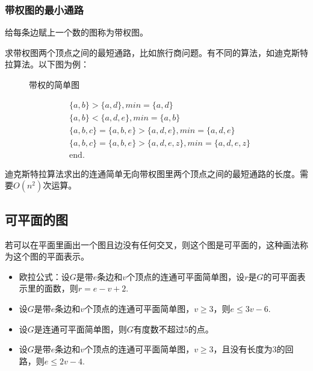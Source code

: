 \subsubsection*{带权图的最小通路}
给每条边赋上一个数的图称为带权图。

求带权图两个顶点之间的最短通路，比如旅行商问题。有不同的算法，如迪克斯特拉算法。以下图为例：

\begin{figure*}[htbp]
    \centering
    \caption{带权的简单图}
\end{figure*}

\begin{align*}
    & \{a, b\} > \{a, d\}, min = \{a ,d\} \\
    & \{a, b\} < \{a, d, e\}, min = \{a,b\} \\
    & \{a, b, c\} = \{a, b, e\} > \{a, d, e\}, min = \{a, d, e\}\\
    & \{a, b, c\} = \{a, b, e\} > \{a, d, e, z\}, min = \{a, d, e, z\}\\
    & \text{end.}
\end{align*}

迪克斯特拉算法求出的连通简单无向带权图里两个顶点之间的最短通路的长度。需要$O(n^2)$次运算。

\subsection{可平面的图}
若可以在平面里画出一个图且边没有任何交叉，则这个图是可平面的，这种画法称为这个图的平面表示。

\begin{itemize}
    \item 欧拉公式：设$G$是带$e$条边和$v$个顶点的连通可平面简单图，设$r$是$G$的可平面表示里的面数，则$r = e - v + 2$.
    \item 设$G$是带$e$条边和$v$个顶点的连通可平面简单图，$v \ge 3$，则$e \le 3v-6$.
    \item 设$G$是连通可平面简单图，则$G$有度数不超过5的点。
    \item 设$G$是带$e$条边和$v$个顶点的连通可平面简单图，$v \ge 3$，且没有长度为3的回路，则$e \le 2v-4$.
\end{itemize}

